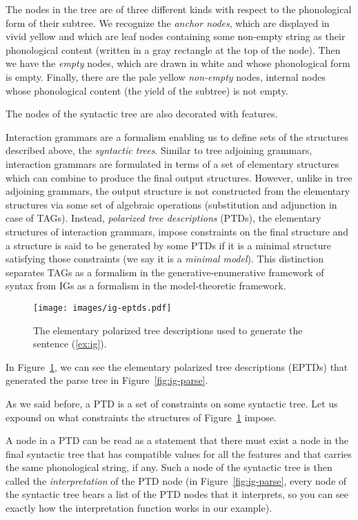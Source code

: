 The nodes in the tree are of three different kinds with respect to the
phonological form of their subtree. We recognize the \emph{anchor
  nodes}, which are displayed in vivid yellow and which are leaf nodes
containing some non-empty string as their phonological content (written
in a gray rectangle at the top of the node). Then we have the
\emph{empty} nodes, which are drawn in white and whose phonological form
is empty. Finally, there are the pale yellow \emph{non-empty} nodes,
internal nodes whose phonological content (the yield of the subtree) is
not empty.

The nodes of the syntactic tree are also decorated with features.

Interaction grammars are a formalism enabling us to define sets of the
structures described above, the \emph{syntactic trees}. Similar to tree
adjoining grammars, interaction grammars are formulated in terms of a
set of elementary structures which can combine to produce the final
output structures. However, unlike in tree adjoining grammars, the
output structure is not constructed from the elementary structures via
some set of algebraic operations (substitution and adjunction in case of
TAGs). Instead, \emph{polarized tree descriptions} (PTDs), the
elementary structures of interaction grammars, impose constraints on the
final structure and a structure is said to be generated by some PTDs if
it is a minimal structure satisfying those constraints (we say it is a
\emph{minimal model}). This distinction separates TAGs as a formalism in
the generative-enumerative framework of syntax from IGs as a formalism
in the model-theoretic framework.

\begin{figure}
  \centering
  \texttt{[image: images/ig-eptds.pdf]}
  \caption{\label{fig:ig-eptds} The elementary polarized tree
    descriptions used to generate the sentence (\ref{ex:ig}).}
\end{figure}

In Figure~\ref{fig:ig-eptds}, we can see the elementary polarized tree
descriptions (EPTDs) that generated the parse tree in
Figure~\ref{fig:ig-parse}.

As we said before, a PTD is a set of constraints on some syntactic
tree. Let us expound on what constraints the structures of
Figure~\ref{fig:ig-eptds} impose.

A node in a PTD can be read as a statement that there must exist a node
in the final syntactic tree that has compatible values for all the
features and that carries the same phonological string, if any. Such a
node of the syntactic tree is then called the \emph{interpretation} of
the PTD node (in Figure~\ref{fig:ig-parse}, every node of the syntactic
tree bears a list of the PTD nodes that it interprets, so you can see
exactly how the interpretation function works in our example).

